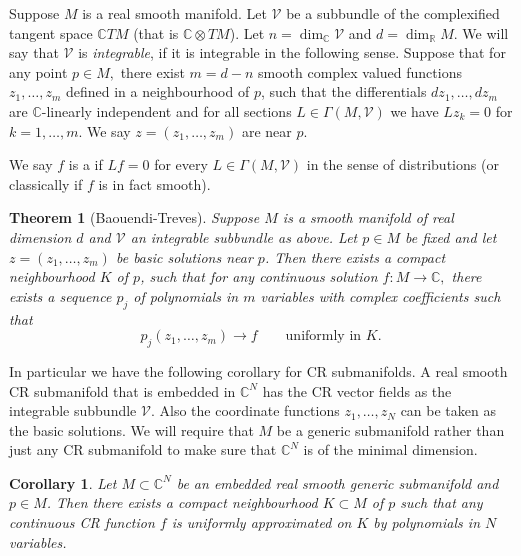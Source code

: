 \documentclass[12pt]{article}
\theoremstyle{theorem}
\newtheorem*{thm}{Theorem}
\newtheorem*{cor}{Corollary}
\theoremstyle{definition}
\theoremstyle{remark}
\begin{document}
Suppose $M$ is a real smooth manifold.  Let $\mathcal{V}$ be a subbundle of the complexified tangent space $\mathbb{C} TM$
(that is $\mathbb{C} \otimes TM$).  Let $n = \dim_{\mathbb{C}} \mathcal{V}$ and $d = \dim_{\mathbb{R}} M .$  We will say that $\mathcal{V}$ is \emph{integrable}, if it is integrable in the following sense.   Suppose that for any
point $p \in M,$
there exist $m = d-n$ smooth complex valued functions
$z_1,\ldots,z_m$ defined in a neighbourhood of $p$, such that the differentials $dz_1,\ldots,dz_m$ are $\mathbb{C}$-linearly independent and for all sections $L \in \Gamma(M,\mathcal{V})$ we have $Lz_k = 0$ for
$k = 1,\ldots,m.$  We say  $z=(z_1,\ldots,z_m)$ are \emph{} near $p.$

We say $f$ is a \emph{} if $Lf = 0$ for every $L \in \Gamma(M,\mathcal{V})$ in the sense
of distributions (or classically if $f$ is in fact smooth).

\begin{thm}[Baouendi-Treves]
Suppose $M$ is a smooth manifold of real dimension $d$ and $\mathcal{V}$ an integrable subbundle as above.
Let $p \in M$ be fixed and let $z=(z_1,\ldots,z_m)$ be basic solutions near $p$.  Then there exists a compact
neighbourhood $K$ of $p$, such that for any continuous solution $f \colon M \to \mathbb{C},$
there exists a sequence $p_j$ of polynomials in $m$ variables with complex coefficients such that
\begin{equation*}
p_j(z_1,\ldots,z_m) \to f
\text{ ~~~~ uniformly in $K.$}
\end{equation*}
\end{thm}

In particular we have the following corollary for CR submanifolds.  A real smooth CR submanifold
that is embedded in ${\mathbb{C}}^N$ has the CR vector fields as the integrable subbundle $\mathcal{V}$.
Also the coordinate functions $z_1,\ldots,z_N$ can be taken as the basic solutions.  We will require that
$M$ be a generic submanifold
rather than just any CR submanifold to make sure that ${\mathbb{C}}^N$ is of the minimal dimension.

\begin{cor}
Let $M \subset {\mathbb{C}}^N$ be an embedded real smooth generic submanifold and $p \in M$.  Then there exists a
compact neighbourhood $K \subset M$ of $p$ such that any continuous CR function $f$ is uniformly approximated on $K$ by polynomials
in $N$ variables.
\end{cor}
\end{document}
